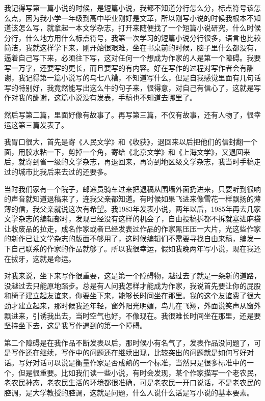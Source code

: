 \documentclass[fontset=fandol,12pt,a5paper]{ctexbook}
\begin{document}
我记得写第一篇小说的时候，是短篇小说，我都不知道分行怎么分，标点符号该怎么点，因为我小学一年级到高中毕业刚好是文革，所以刚写小说的时候我根本不知道该怎么写，就拿起一本文学杂志，打开来随便找了一个短篇小说研究，什么时候分行，什么地方用什么标点符号，我第一次学习的短篇小说分行很多，语言也比较简洁，我就这样学下来，刚开始很艰难，坐在书桌前的时候，脑子里什么都没有，逼着自己写下来，必须往下写，这对任何一个想成为作家的人是第一个障碍。我要写一万字，还要写的更长，而且要写的有内容。好在写作的过程对写作者会有酬谢，我记得第一篇小说写的乌七八糟，不知道写什么，但是自我感觉里面有几句话写的特别好，我竟然能写出这么牛的句子来，很得意，对自己有信心了，这就是写作对我的酬谢，这篇小说没有发表，手稿也不知道去哪里了。

然后写第二篇，里面好像有故事了。再写第三篇，不仅有故事，还有人物了，很幸运这第三篇发表了。

我胃口很大，首先是寄《人民文学》和《收获》，退回来以后把他们的信封翻一个面，用胶水粘一下，剪掉一个角，寄给《北京文学》和《上海文学》，又退回来后，就寄到省一级的文学杂志，再退回来，再寄到地区级文学杂志，我当时手稿走过的城市比我后来去过的还要多。

当时我们家有一个院子，邮递员骑车过来把退稿从围墙外面扔进来，只要听到很响的声音就知道退稿来了，连我父亲都知道。有时候如果飞进来像雪花一样飘扬的薄薄的信，我父亲就说这次有希望。我1983年发表小说，两年以后，1985年再去几家文学杂志的编辑部时，发现已经没有这样的机会了，自由投稿拆都不拆就塞进麻袋让收废品的拉走，成名作家或者已经发表过作品的作家黑压压一大片，光这些作家的新作已让文学杂志的版面不够用了，这时候编辑们不需要寻找自由来稿，编发一下自己联系的作家的作品就够了。所以我很幸运，假如我晚两年写小说，现在我还在拔牙，这就是命运。

对我来说，坐下来写作很重要，这是第一个障碍物，越过去了就是一条新的道路，没越过去只能原地踏步。总是有人问我怎样才能成为作家，我说首先要让你的屁股和椅子建立起友谊来，你要坐下来，能够长时间坐在那里。我的这个友谊费了很大劲才建立起来，那时候我还年轻，窗外阳光明媚，鸟儿在飞翔，外面说笑声从窗外飘进来，引诱我出去，当时空气也好，不像现在。我很难长时间坐在那里，还是要坚持坐下去，这是我写作遇到的第一个障碍。

第二个障碍是在我作品不断发表以后，那时候小有名气了，发表作品没问题了，可是写作还在继续，写作中的问题还在继续出现，比较突出的问题就是如何写好对话。写好对话可以说是衡量作家是否成熟的一个标准，当然只是很多标准中的一个，但是很重要。比如我们读一些小说，有时会发现，某个作家描写一个老农民，老农民神态，老农民生活的环境都很准确，可是老农民一开口说话，不是老农民的腔调，是大学教授的腔调，这就是问题，什么人说什么话是写小说的基本要素。
\end{document}
